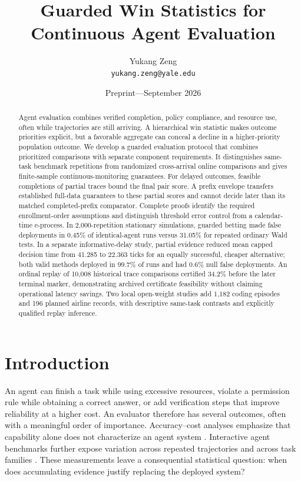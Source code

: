 \documentclass[11pt,letterpaper]{article}
\title{Guarded Win Statistics for Continuous Agent Evaluation}
\author{Yukang Zeng\\\texttt{yukang.zeng@yale.edu}}
\date{Preprint---September 2026}
\begin{document}
\maketitle

\begin{abstract}
Agent evaluation combines verified completion, policy compliance, and
resource use, often while trajectories are still arriving. A hierarchical
win statistic makes outcome priorities explicit, but a favorable
aggregate can conceal a decline in a higher-priority population outcome.
We develop a guarded evaluation protocol that combines prioritized
comparisons with separate component requirements. It distinguishes
same-task benchmark repetitions from randomized cross-arrival online
comparisons and gives finite-sample continuous-monitoring guarantees.
For delayed outcomes, feasible completions of partial traces bound the
final pair score. A prefix envelope transfers established full-data
guarantees to these partial scores and cannot decide later than its
matched completed-prefix comparator. Complete proofs identify the
required enrollment-order assumptions and distinguish threshold error
control from a calendar-time e-process. In 2,000-repetition stationary
simulations, guarded betting made false deployments in 0.45\% of
identical-agent runs versus 31.05\% for repeated ordinary Wald tests.
In a separate informative-delay study, partial evidence reduced mean
capped decision time from 41.285 to 22.363 ticks for an equally successful,
cheaper alternative; both valid methods deployed in 99.7\% of runs and
had 0.6\% null false deployments. An ordinal replay of 10,008
historical trace comparisons certified 34.2\% before the later terminal
marker, demonstrating archived certificate feasibility without claiming operational
latency savings. Two local open-weight studies add 1,182 coding episodes and 196 planned
airline records, with descriptive same-task contrasts and explicitly
qualified replay inference.
\end{abstract}

\section{Introduction}
An agent can finish a task while using excessive resources, violate a
permission rule while obtaining a correct answer, or add verification
steps that improve reliability at a higher cost. An evaluator therefore
has several outcomes, often with a meaningful order of importance.
Accuracy--cost analyses emphasize that capability alone does not
characterize an agent system \citep{kapoor2024agents}. Interactive agent
benchmarks further expose variation across repeated trajectories and
across task families \citep{tau2bench2025,sweagent2024}. These measurements
leave a consequential statistical question: when does accumulating
evidence justify replacing the deployed system?
\end{document}
